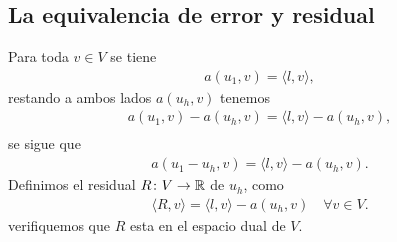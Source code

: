 \subsection{La equivalencia de error y residual}
Para toda $v\in V$ se tiene 
\begin{equation}
\begin{split}
a(u_{1},v)=\langle l,v \rangle,
\end{split}
\end{equation}
restando a ambos lados $a(u_{h},v)$ tenemos 
\begin{equation}
\begin{split}
a(u_{1},v) - a(u_{h},v)=\langle l,v \rangle - a(u_{h},v),\\
\end{split}
\end{equation}
se sigue que 
\begin{equation}\label{Resiual1}
\begin{split}
a(u_{1}-u_{h},v)=\langle l,v \rangle - a(u_{h},v).
\end{split}
\end{equation}
Definimos el residual $R\colon V\to {\ensuremath{\mathbb{R}}}$ de $u_{h}$,  como 
\begin{equation*}
\begin{split}
\langle R,v \rangle = \langle l,v \rangle - a(u_{h},v)\quad \forall v\in V.
\end{split}
\end{equation*}
verifiquemos que $R$ esta en el espacio dual de $V$. 
